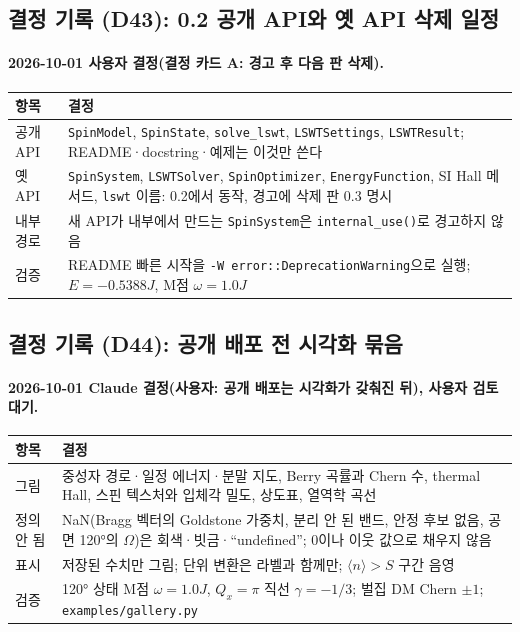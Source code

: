 \subsection{결정 기록 (D43): 0.2 공개 API와 옛 API 삭제 일정}\label{decisions-d43-api}
\begingroup%
  \framesubtitle{2026-10-01 사용자 결정(결정 카드 A: 경고 후 다음 판 삭제).}
  \small\renewcommand{\arraystretch}{1.12}
  \begin{tabularx}{\textwidth}{@{}P{3.0cm}Y@{}}
    \toprule
    항목 & 결정 \\
    \midrule
    공개 API & \texttt{SpinModel}, \texttt{SpinState}, \texttt{solve\_lswt}, \texttt{LSWTSettings}, \texttt{LSWTResult}; README·docstring·예제는 이것만 쓴다 \\
    옛 API & \texttt{SpinSystem}, \texttt{LSWTSolver}, \texttt{SpinOptimizer}, \texttt{EnergyFunction}, SI Hall 메서드, \texttt{lswt} 이름: 0.2에서 동작, 경고에 삭제 판 0.3 명시 \\
    내부 경로 & 새 API가 내부에서 만드는 \texttt{SpinSystem}은 \texttt{internal\_use()}로 경고하지 않음 \\
    검증 & README 빠른 시작을 \texttt{-W error::DeprecationWarning}으로 실행; $E=-0.5388J$, M점 $\omega=1.0J$ \\
    \bottomrule
  \end{tabularx}
\endgroup


\subsection{결정 기록 (D44): 공개 배포 전 시각화 묶음}\label{decisions-d44-figures}
\begingroup%
  \framesubtitle{2026-10-01 Claude 결정(사용자: 공개 배포는 시각화가 갖춰진 뒤), 사용자 검토 대기.}
  \small\renewcommand{\arraystretch}{1.12}
  \begin{tabularx}{\textwidth}{@{}P{3.0cm}Y@{}}
    \toprule
    항목 & 결정 \\
    \midrule
    그림 & 중성자 경로·일정 에너지·분말 지도, Berry 곡률과 Chern 수, thermal Hall, 스핀 텍스처와 입체각 밀도, 상도표, 열역학 곡선 \\
    정의 안 됨 & NaN(Bragg 벡터의 Goldstone 가중치, 분리 안 된 밴드, 안정 후보 없음, 공면 120°의 $\Omega$)은 회색·빗금·``undefined''; 0이나 이웃 값으로 채우지 않음 \\
    표시 & 저장된 수치만 그림; 단위 변환은 라벨과 함께만; $\langle n\rangle>S$ 구간 음영 \\
    검증 & 120° 상태 M점 $\omega=1.0J$, $Q_x=\pi$ 직선 $\gamma=-1/3$; 벌집 DM Chern $\pm1$; \texttt{examples/gallery.py} \\
    \bottomrule
  \end{tabularx}
\endgroup


